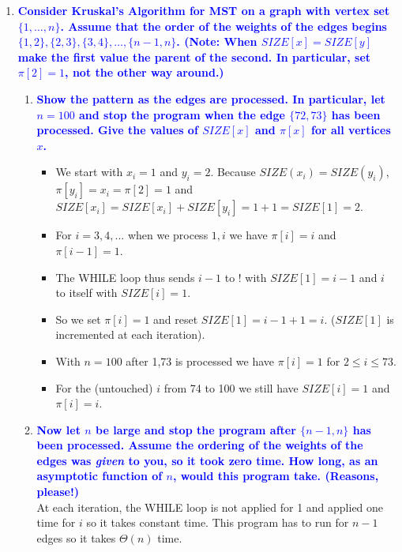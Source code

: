 \documentclass[11pt]{article}
\begin{document}
\begin{enumerate}
\item \textbf{\textcolor{blue}{Consider Kruskal's Algorithm for MST on a graph with vertex set $\{1,\ldots,n\}$. Assume that the order of the weights of the edges begins $\{1,2\}, \{2,3\}, \{3,4\},\ldots, \{n-1,n\}$. (Note: When $SIZE[x]=SIZE[y]$ make the first value the parent of the second. In particular, set $\pi[2]=1$, not the other way around.)}}
    \begin{enumerate}
    \item \textbf{\textcolor{blue}{Show the pattern as the edges are processed. In particular, let $n=100$ and stop the program when the edge $\{72,73\}$ has been processed. Give the values of $SIZE[x]$ and $\pi[x]$ for all vertices $x$.}}
        \begin{itemize}
            \item We start with $x_i = 1$ and $y_i = 2$. Because $SIZE(x_i) = SIZE(y_i)$, $\pi[y_i] = x_i= \pi[2] = 1$ and $SIZE[x_i] = SIZE[x_i] + SIZE[y_i] = 1 + 1 = SIZE[1] = 2$. 
            \item For $i = 3,4,...$ when we process $1,i$ we have $\pi[i] = i$ and $\pi[i - 1] = 1$.
            \item The WHILE loop thus sends $i-1$ to ! with $SIZE[1] = i-1$ and $i$ to itself with $SIZE[i] = 1$.
            \item So we set $\pi[i] = 1$ and reset $SIZE[1] = i-1+1 = i$.
            ($SIZE[1]$ is incremented at each iteration).
            \item With $n=100$ after {1,73} is processed we have $\pi[i] = 1$ for $2 \leq i \leq 73$.
            \item For the (untouched) $i$ from 74 to 100 we still have $SIZE[i] = 1$ and $\pi[i] = i$.
        \end{itemize}
    \item \textbf{\textcolor{blue}{Now let $n$ be large and stop the program after $\{n-1,n\}$ has been processed. Assume the ordering of the weights of the edges was {\em given} to you, so it took zero time. How long, as an asymptotic function of $n$, would this program take. (Reasons, please!)}}
        \\ At each iteration, the WHILE loop is not applied for 1 and applied one time for $i$ so it takes constant time. This program has to run for $n - 1$ edges so it takes $\Theta(n)$ time.
    \end{enumerate}


\end{enumerate}
\end{document}

